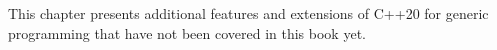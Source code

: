 This chapter presents additional features and extensions of C++20 for generic programming that have not been covered in this book yet.